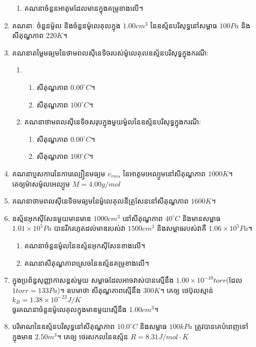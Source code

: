 \begin{enumerate}[m]
\begin{enumerate}[k]
	\item គណនាចំនួនអាតូមដែលមានក្នុងគម្រូខាងលើ។
\end{enumerate}
\item គណនាៈ ចំនួនម៉ូល និងចំនួនម៉ូលេគុលក្នុង $1.00cm^{3}$ នៃឧស្ម័នបរិសុទ្ធនៅសម្ពាធ $100Pa$ និងសីតុណ្ហភាព $220K$។
\item គណនាតម្លៃមធ្យមនៃថាមពលសុីនេទិចរបស់ម៉ូលេគុលឧស្ម័នបរិសុទ្ធក្នុងករណីៈ
\begin{enumerate}[1]
	\item \begin{enumerate}[k]
		\item សីតុណ្ហភាព $0.00^\circ C$។
		\item សីតុណ្ហភាព $100^\circ C$។
	\end{enumerate}
	\item គណនាថាមពលសុីនេទិចសរុបក្នុងមួយម៉ូលនៃឧស្ម័នបរិសុទ្ធក្នុងករណីៈ
	\begin{enumerate}[k]
		\item សីតុណ្ហភាព $0.00^\circ C$។
		\item សីតុណ្ហភាព $100^\circ C$។
	\end{enumerate}
\end{enumerate}
\item គណនា​ប្ញសការេនៃការេល្បឿនមធ្យម $v_{rms}$ នៃអាតូមអេល្យូមនៅសីតុណ្ហភាព $1000K$។ \\គេឲ្យម៉ាសម៉ូលអេល្យូម $M=4.00g/mol$
\item គណនាថាមពលសុីនេទិចមធ្យមនៃម៉ូលេគុលនីត្រូសែននៅសីតុណ្ហភាព $1600K$។
\item ឧស្ម័នអុកសុីសែនមួយមានមាឌ $1000cm^{3}$ នៅសីតុណ្ហភាព $40^\circ C$ និងមានសម្ពាធ $1.01\times10^{5}Pa$ បានរីករហូតដល់មាឌរបស់វា $1500cm^{3}$ និងសម្ពាធរបស់វាគឺ $1.06\times10^{5}Pa$។
\begin{enumerate}[k]
	\item គណនាចំនួនម៉ូលនៃឧស្ម័នអុកសុីសែនខាងលើ។
	\item គណនាសីតុណ្ហភាពស្រេចនៃឧស្ម័នគម្រូខាងលើ។
\end{enumerate}
\item ក្នុងប្រព័ន្ធសុញ្ញាកាសខ្ពស់មួយ សម្ពាធដែលអាចវាស់បានស្មើនឹង $1.00\times10^{-10}torr$(ដែល $1torr=133Pa$)។ ឧបមាថា សីតុណ្ហភាពស្មើនឹង $300K$។ គេឲ្យ ថេប៊ុលស្មាន់ $k_{B}=1.38\times10^{-23}J/K$\\
ចូរគណនាចំនួនម៉ូលេគុលក្នុងមាឌមួយស្មើនឹង $1.00cm^{3}$។
\item បរិមាណនៃឧស្ម័នបរិសុទ្ធនៅសីតុណ្ហភាព $10.0^\circ C$ និងសម្ពាធ $100kPa$ ត្រូវបានគេបំពេញទៅក្នុងមាឌ $2.50m^{3}$។ គេឲ្យ ថេរសកលនៃឧស្ម័ន $R=8.31J/mol\cdot K$
\begin{enumerate}[k]

\end{enumerate}
\end{enumerate}

